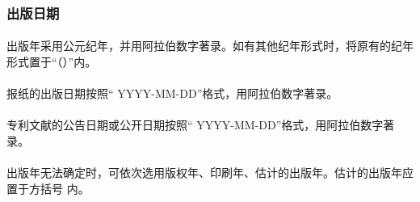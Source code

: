 \documentclass[twoside]{article}%
\begin{document}
\begin{refsection}

\nocite{egbookpubpublishere--}
\nocite{egbookpubpublisherf--}

{}
\end{refsection}



\subsubsection{出版日期}

\paragraph{} 出版年采用公元纪年，并用阿拉伯数字著录。如有其他纪年形式时，将原有的纪年形式置于“（\space  ）”内。

\begin{refsection}
\nocite{egbookpubdatea--}
\nocite{egbookpubdateb--}

{}
\end{refsection}

\paragraph{} 报纸的出版日期按照“ YYYY-MM-DD”格式，用阿拉伯数字著录。


\begin{refsection}
\nocite{egbookpubdatec--}

{}
\end{refsection}

\paragraph{} 专利文献的公告日期或公开日期按照“ YYYY-MM-DD”格式，用阿拉伯数字著录。

\begin{refsection}
\nocite{egbookpubdateh--}

{}
\end{refsection}

\paragraph{} 出版年无法确定时，可依次选用版权年、印刷年、估计的出版年。估计的出版年应置于方括号
内。
\end{document}
